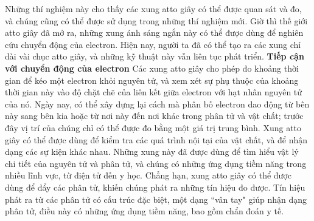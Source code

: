 \begin{multicols}{2}
	\vskip 0.1cm
	Những thí nghiệm này cho thấy các xung atto giây có thể được quan sát và đo, và chúng cũng có thể được sử dụng trong những thí nghiệm mới.
	\vskip 0.1cm
	Giờ thì thế giới atto giây đã mở ra, những xung ánh sáng ngắn này có thể được dùng để nghiên cứu chuyển động của electron. Hiện nay, người ta đã có thể tạo ra các xung chỉ dài vài chục atto giây, và những kỹ thuật này vẫn liên tục phát triển.
	\vskip 0.1cm
	\textbf{\color{timhieukhoahoc}Tiếp cận với chuyển động của electron}
	\vskip 0.1cm
	Các xung atto giây cho phép đo khoảng thời gian để kéo một electron khỏi nguyên tử, và xem xét sự phụ thuộc của khoảng thời gian này vào độ chặt chẽ của liên kết giữa electron với hạt nhân nguyên tử của nó. Ngày nay, có thể xây dựng lại cách mà phân bố electron dao động từ bên này sang bên kia hoặc từ nơi này đến nơi khác trong phân tử và vật chất; trước đây vị trí của chúng chỉ có thể được đo bằng một giá trị trung bình.
	\vskip 0.1cm
	Xung atto giây có thể được dùng để kiểm tra các quá trình nội tại của vật chất, và để nhận dạng các sự kiện khác nhau. Những xung này đã được dùng để tìm hiểu vật lý chi tiết của nguyên tử và phân tử, và chúng có những ứng dụng tiềm năng trong nhiều lĩnh vực, từ điện tử đến y học.
	\vskip 0.1cm
	Chẳng hạn, xung atto giây có thể được dùng để đẩy các phân tử, khiến chúng phát ra những tín hiệu đo được. Tín hiệu phát ra từ các phân tử có cấu trúc đặc biệt, một dạng ``vân tay" giúp nhận dạng phân tử, điều này có những ứng dụng tiềm năng, bao gồm chẩn đoán y tế.
\end{multicols}